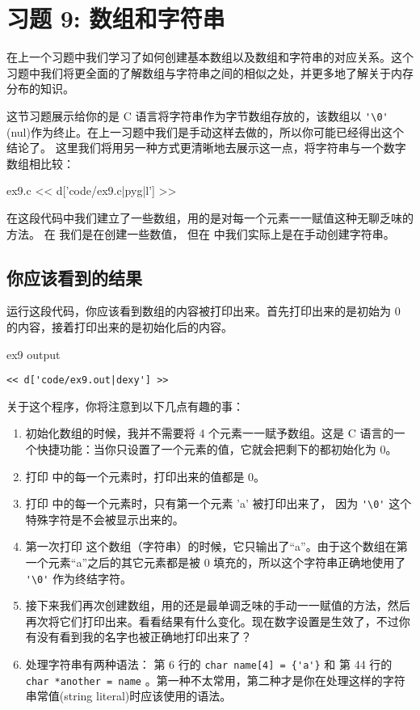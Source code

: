 \chapter{习题 9: 数组和字符串}

在上一个习题中我们学习了如何创建基本数组以及数组和字符串的对应关系。这个习题中我们将更全面的了解数组与字符串之间的相似之处，并更多地了解关于内存分布的知识。

这节习题展示给你的是 C 语言将字符串作为字节数组存放的，该数组以 \verb|'\0'| (nul)作为终止。在上一习题中我们是手动这样去做的，所以你可能已经得出这个结论了。 这里我们将用另一种方式更清晰地去展示这一点，将字符串与一个数字数组相比较：

\begin{code}{ex9.c}
<< d['code/ex9.c|pyg|l'] >>
\end{code}

在这段代码中我们建立了一些数组，用的是对每一个元素一一赋值这种无聊乏味的方法。 在  我们是在创建一些数值， 但在  中我们实际上是在手动创建字符串。


\section{你应该看到的结果}

运行这段代码，你应该看到数组的内容被打印出来。首先打印出来的是初始为 0 的内容，接着打印出来的是初始化后的内容。

\begin{code}{ex9 output}
\begin{lstlisting}
<< d['code/ex9.out|dexy'] >>
\end{lstlisting}
\end{code}

关于这个程序，你将注意到以下几点有趣的事：

\begin{enumerate}
\item 初始化数组的时候，我并不需要将 4 个元素一一赋予数组。这是 C 语言的一个快捷功能：当你只设置了一个元素的值，它就会把剩下的都初始化为 0。
\item 打印  中的每一个元素时，打印出来的值都是 0。
\item 打印  中的每一个元素时，只有第一个元素 'a' 被打印出来了， 因为 \verb|'\0'| 这个特殊字符是不会被显示出来的。 
\item 第一次打印  这个数组（字符串）的时候，它只输出了“a”。由于这个数组在第一个元素“a”之后的其它元素都是被 0 填充的，所以这个字符串正确地使用了 \verb|'\0'| 作为终结字符。
\item 接下来我们再次创建数组，用的还是最单调乏味的手动一一赋值的方法，然后再次将它们打印出来。看看结果有什么变化。现在数字设置是生效了，不过你有没有看到我的名字也被正确地打印出来了？
\item 处理字符串有两种语法： 第 6 行的 \verb|char name[4] = {'a'}| 和 第 44 行的 \verb|char *another = name| 。第一种不太常用，第二种才是你在处理这样的字符串常值(string literal)时应该使用的语法。
\end{enumerate}


